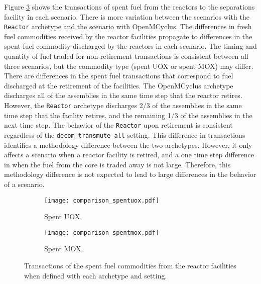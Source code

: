 Figure \ref{fig:comparison_spentfuel} shows the transactions of 
spent fuel from the reactors to the separations facility in each 
scenario. There is more variation between the scenarios with the 
\Cycamore \texttt{Reactor} archetype and the scenario with OpenMCyclus. 
The differences in fresh fuel commodities received by the 
reactor facilities propagate to differences in the spent fuel commodity 
discharged by the reactors in each scenario. The timing and quantity of 
fuel traded for non-retirement transactions is consistent between all 
three scenarios, but the commodity type (spent UOX or spent MOX) may 
differ. There are differences in the spent fuel 
transactions that correspond to fuel discharged at the retirement of the 
facilities. The OpenMCyclus archetype discharges all of the assemblies 
in the same time step that the reactor retires. However, the \Cycamore 
\texttt{Reactor} archetype discharges 2/3 of the assemblies in the same 
time step that the facility retires, and the remaining 1/3 of the assemblies 
in the next time step. The behavior of the \Cycamore \texttt{Reactor} 
upon retirement is consistent regardless of the \texttt{decom\_transmute\_all}
setting. This difference in transactions identifies a methodology 
difference between the two archetypes. However, it only affects a 
scenario when a reactor facility is retired, and a one time step difference 
in when the fuel from the core is traded away is not large. Therefore, 
this methodology difference is not expected to lead to large differences 
in the behavior of a scenario. 

\begin{figure}[ht!]
    \centering
    \begin{subfigure}[b]{0.48\textwidth}
        \centering
        \texttt{[image: comparison\_spentuox.pdf]}
        \caption{Spent UOX.}
        \label{fig:comparison_spentuox}
    \end{subfigure}
    \hfill
    \begin{subfigure}[b]{0.48\textwidth}
        \centering
        \texttt{[image: comparison\_spentmox.pdf]}
        \caption{Spent MOX.}
        \label{fig:comparison_spentmox}
    \end{subfigure}
       \caption{Transactions of the spent fuel commodities from the 
       reactor facilities when defined with each archetype and 
       setting.}
       \label{fig:comparison_spentfuel}
\end{figure}


